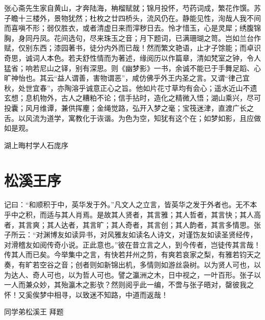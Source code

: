 张心斋先生家自黄山，才奔陆海，柟榴赋就；锦月投怀，芍药词成，繁花作馔。苏子瞻十三楼外，景物犹然；杜枚之廿四桥头，流风仍在。静能见性，洵哉人我不间而喜嗔不形；弱仅胜衣，或者清虚日来而滓秽日去。怜才惜玉，心是灵犀；绣腹锦胸，身同丹凤。花间选句，尽来珠玉之音；月下题词，已满珊瑚之笥。岂如兰台作赋，仅别东西；漆园著书，徒分内外而已哉！然而繁文艳语，止才子馀能；而卓识奇思，诚词人本色。若夫舒性情而为著述，缘阅历以作篇章，清如梵室之钟，令人猛省；响若尼山之铎，别有深思。则《幽梦影》一书，余诚不能已于手舞足蹈、心旷神怡也。其云“益人谓善，害物谓恶”，咸仿佛乎外王内圣之言。又谓“律己宜秋，处世宜春”，亦陶溶乎诚意正心之旨。他如片花寸草均有会心；遥水近山不遗玄想；息机物外，古人之糟粕不论；信手拈时，造化之精微入悟；湖山乘兴，尽可投囊；风月维谭，兼供挥麈；金绳觉路，弘开入梦之毫；宝筏迷津，直渡广长之舌。以风流为道学，寓教化于诙谐。为色为空，知犹有这个在；如梦如影，且应做如是观。



湖上晦村学人石庞序


\section{松溪王序}

记曰：“和顺积于中，英华发于外。”凡文人之立言，皆英华之发于外者也。无不本乎中之积，而适与其人肖焉。是故其人贤者，其言雅；其人哲者，其言快；其人高者，其言爽；其人达者，其言旷；其人奇者，其言创；其人韵者，其言多情思。张子所云：“对渊博友如读异书，对风雅友如读名人诗文，对谨饬友如读圣贤经传，对滑稽友如阅传奇小说。正此意也。”彼在昔立言之人，到今传者，岂徒传其言哉！传其人而已矣。今举集中之言，有快若幷州之剪，有爽若哀家之梨，有雅若钧天之奏，有旷若空谷之音；创者则如新锦出机，多情则如游丝袅树。以为贤人可也，以为达人、奇人可也，以为哲人可也。譬之瀛洲之木，日中视之，一叶百形。张子以一人而兼众妙，其殆瀛木之影欤？然则阅乎此一编，不啻与张子晤对，罄彼我之怀！又奚俟梦中相寻，以致迷不知路，中道而返哉！

同学弟松溪王 拜题
